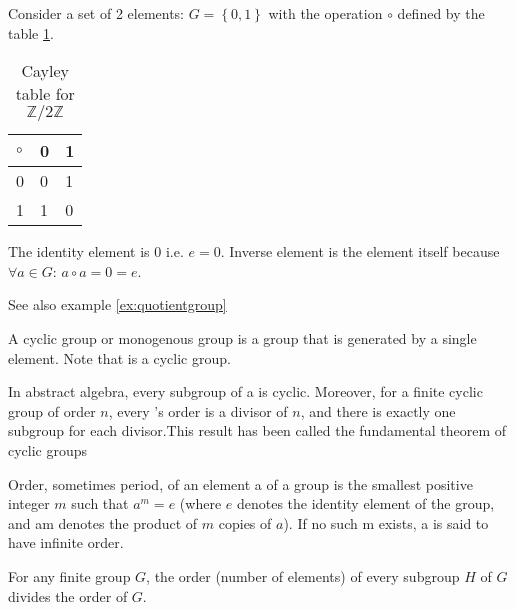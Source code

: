 \begin{appendices}
\begin{example}
  Consider a set of 2 elements: $G = \left\{0, 1\right\}$ with the
  operation $\circ$ defined by the table \ref{tab:CayleyZ2Z}.
  \begin{table}
    \centering
    \caption{Cayley table for $\mathbb{Z}/2\mathbb{Z}$}
    \label{tab:CayleyZ2Z}
    \begin{tabular}{l|ll}
      \toprule
      $\circ$ & 0 & 1 \\
      \midrule
      0 & 0 & 1 \\
      1 & 1 & 0 \\
      \bottomrule
    \end{tabular}
  \end{table}

  The identity element is $0$ i.e. $e = 0$.
  Inverse element is the element itself
  because $\forall a \in G$: $a \circ a = 0 = e$.

  See also example \ref{ex:quotientgroup}
  \label{ex:groupZ2}
\end{example}

\begin{definition}
  A cyclic group or monogenous group is a group that is generated by a
  single element.
  Note that  is a cyclic group.
  \label{def:cyclicgroup}
\end{definition}

\begin{theorem}
  In abstract algebra, every subgroup of a  is
  cyclic. Moreover, for a finite cyclic group of order $n$, every
  's order is a divisor of $n$, and there is
  exactly one subgroup for each divisor.This result has been called the
  fundamental theorem of cyclic groups
  \cite{wiki:subgroups_of_cyclic_groups}
  \label{thm:fundamentaltheoremofcyclicgroup}
\end{theorem}

\begin{definition}
  Order, sometimes period, of an element a of a group is the smallest
  positive integer $m$ such that $a^m = e$ (where $e$ denotes the identity
  element of the group, and am denotes the product of $m$ copies of
  $a$). If no such m exists, a is said to have infinite order.
  \label{def:grouporder}
\end{definition}

\begin{theorem}[Lagrange]
  For any finite group $G$, the order (number of elements) of every
  subgroup $H$ of $G$ divides the order of $G$. 
  \label{thm:lagrange}
\end{theorem}


\end{appendices}
